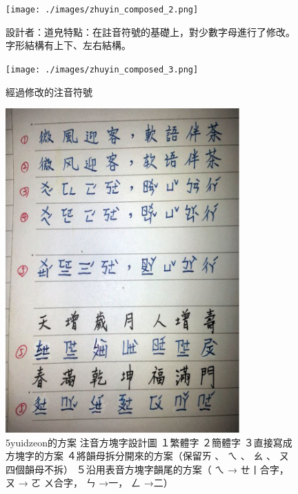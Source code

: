 \documentclass[a5paper, 10pt, openany]{book} %
\begin{document}
\begin{figure}[h]
  \centering
  \texttt{[image: ./images/zhuyin\_composed\_2.png]}
  \caption{設計者：道皃特點：在註音符號的基礎上，對少數字母進行了修改。字形結構有上下、左右結構。}
  \label{fig:zhuyin_composed_2}
\end{figure}

\begin{figure}[h]
  \centering
  \texttt{[image: ./images/zhuyin\_composed\_3.png]}
  \caption{經過修改的注音符號}
\end{figure}


\begin{figure}[h]
  \centering
  \includegraphics[width=0.8\textwidth]{./images/zhuyin_composed_4.png}
  \caption{5yuidzeon的方案 注音方塊字設計圖 １繁體字 ２簡體字 ３直接寫成方塊字的方案 ４將韻母拆分開來的方案（保留ㄞ 、 ㄟ 、 ㄠ 、 ㄡ四個韻母不拆） ５沿用表音方塊字韻尾的方案（ ㄟ → ㄝ丨合字， ㄡ → ㄛ ㄨ合字， ㄣ →一， ㄥ →二）}
\end{figure}
\end{document}
